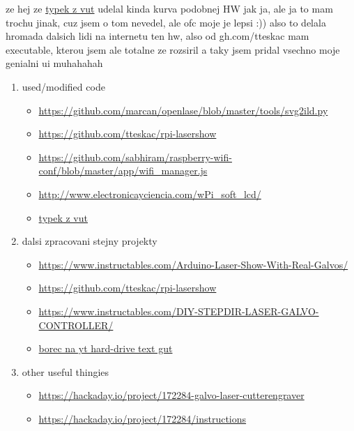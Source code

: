 \documentclass{template/socthesis}
\begin{document}
ze hej ze \href{https://dspace.vutbr.cz/bitstream/handle/11012/38621/final-thesis.pdf?sequence=-1}{typek z vut} udelal kinda kurva podobnej HW jak ja, ale ja to mam trochu jinak, cuz jsem o tom nevedel, ale ofc moje je lepsi :))
also to delala hromada dalsich lidi na internetu ten hw, also od gh.com/tteskac mam executable, kterou jsem ale totalne ze rozsiril a taky jsem pridal vsechno moje genialni ui muhahahah

\begin{enumerate}
  \item used/modified code
        \begin{itemize}
          \item \url{https://github.com/marcan/openlase/blob/master/tools/svg2ild.py}
          \item \url{https://github.com/tteskac/rpi-lasershow}
          \item \url{https://github.com/sabhiram/raspberry-wifi-conf/blob/master/app/wifi_manager.js}
          \item \url{http://www.electronicayciencia.com/wPi_soft_lcd/}
          \item \href{https://dspace.vutbr.cz/bitstream/handle/11012/38621/final-thesis.pdf?sequence=-1}{typek z vut}
        \end{itemize}
  \item dalsi zpracovani stejny projekty
        \begin{itemize}
          \item \url{https://www.instructables.com/Arduino-Laser-Show-With-Real-Galvos/}
          \item \url{https://github.com/tteskac/rpi-lasershow}
          \item \url{https://www.instructables.com/DIY-STEPDIR-LASER-GALVO-CONTROLLER/}
          \item \href{https://youtu.be/u9TpJ-_hBR8?si=mHy-UrptZZJ0Xu5-}{borec na yt hard-drive text gut}
        \end{itemize}
  \item other useful thingies
        \begin{itemize}
          \item \url{https://hackaday.io/project/172284-galvo-laser-cutterengraver}

          \item \url{https://hackaday.io/project/172284/instructions}


\end{itemize}
\end{enumerate}
\end{document}
